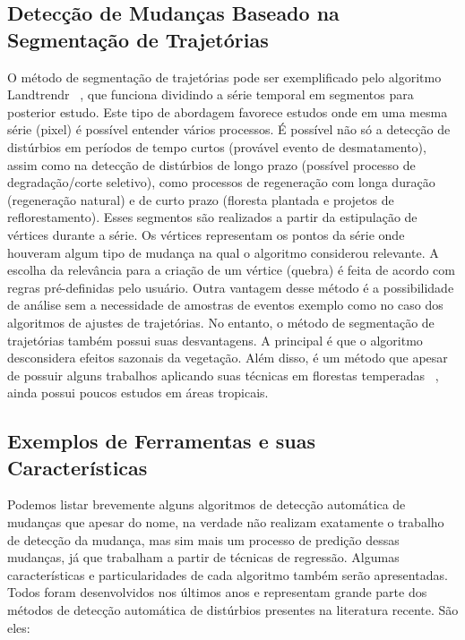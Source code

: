 \documentclass[twocolumn]{article}
\begin{document}
\subsection{Detecção de Mudanças Baseado na Segmentação de Trajetórias}
O método de segmentação de trajetórias pode ser exemplificado pelo algoritmo Landtrendr ~\cite{KENNEDY20102897, KENNEDY2012117}, que funciona dividindo a série temporal em segmentos para posterior estudo. Este tipo de abordagem favorece estudos onde em uma mesma série (pixel) é possível entender vários processos. É possível não só a detecção de distúrbios em períodos de tempo curtos (provável evento de desmatamento), assim como na detecção de distúrbios de longo prazo (possível processo de degradação/corte seletivo), como processos de regeneração com longa duração (regeneração natural) e de curto prazo (floresta plantada e projetos de reflorestamento). Esses segmentos são realizados a partir da estipulação de vértices durante a série. Os vértices representam os pontos da série onde houveram algum tipo de mudança na qual o algoritmo considerou relevante. A escolha da relevância para a criação de um vértice (quebra) é feita de acordo com regras pré-definidas pelo usuário. Outra vantagem desse método é a possibilidade de análise sem a necessidade de amostras de eventos exemplo como no caso dos algoritmos de ajustes de trajetórias.
No entanto, o método de segmentação de trajetórias também possui suas desvantagens. A principal é que o algoritmo desconsidera efeitos sazonais da vegetação. Além disso, é um método que apesar de possuir alguns trabalhos aplicando suas técnicas em florestas temperadas ~\cite{PFLUGMACHER2012146, Griffiths2015}, ainda possui poucos estudos em áreas tropicais.

\subsection{Exemplos de Ferramentas e suas Características}
Podemos listar brevemente alguns algoritmos de detecção automática de mudanças que apesar do nome, na verdade não realizam exatamente o trabalho de detecção da mudança, mas sim mais um processo de predição dessas mudanças, já que trabalham a partir de técnicas de regressão. Algumas características e particularidades de cada algoritmo também serão apresentadas. Todos foram desenvolvidos nos últimos anos e representam grande parte dos métodos de detecção automática de distúrbios presentes na literatura recente. São eles:
\end{document}
